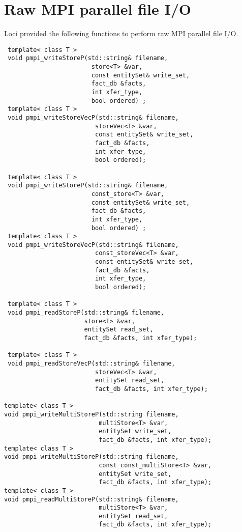 \documentclass{article}
\begin{document}
\section {Raw  MPI parallel file I/O }
Loci provided the following functions to perform raw MPI parallel file
I/O.
 \begin{lstlisting}
 template< class T >
 void pmpi_writeStoreP(std::string& filename,                              
                        store<T> &var,
                        const entitySet& write_set,
                        fact_db &facts,
                        int xfer_type,
                        bool ordered) ;
 template< class T >
 void pmpi_writeStoreVecP(std::string& filename,
                         storeVec<T> &var,
                         const entitySet& write_set,
                         fact_db &facts,
                         int xfer_type,
                         bool ordered);

 template< class T >
 void pmpi_writeStoreP(std::string& filename,                              
                        const_store<T> &var,
                        const entitySet& write_set,
                        fact_db &facts,
                        int xfer_type,
                        bool ordered) ;
 template< class T >
 void pmpi_writeStoreVecP(std::string& filename,
                         const_storeVec<T> &var,
                         const entitySet& write_set,
                         fact_db &facts,
                         int xfer_type,
                         bool ordered);

 template< class T >
 void pmpi_readStoreP(std::string& filename,
                      store<T> &var,
                      entitySet read_set,
                      fact_db &facts, int xfer_type);

 template< class T >
 void pmpi_readStoreVecP(std::string& filename,
                         storeVec<T> &var,
                         entitySet read_set,
                         fact_db &facts, int xfer_type);

template< class T >
void pmpi_writeMultiStoreP(std::string filename,                              
                          multiStore<T> &var,
                          entitySet write_set,
                          fact_db &facts, int xfer_type);
template< class T >
void pmpi_writeMultiStoreP(std::string filename,
                          const const_multiStore<T> &var,
                          entitySet write_set,
                          fact_db &facts, int xfer_type);  
template< class T >
void pmpi_readMultiStoreP(std::string& filename,
                          multiStore<T> &var,
                          entitySet read_set,
                          fact_db &facts, int xfer_type);

\end{lstlisting}
\end{document}
